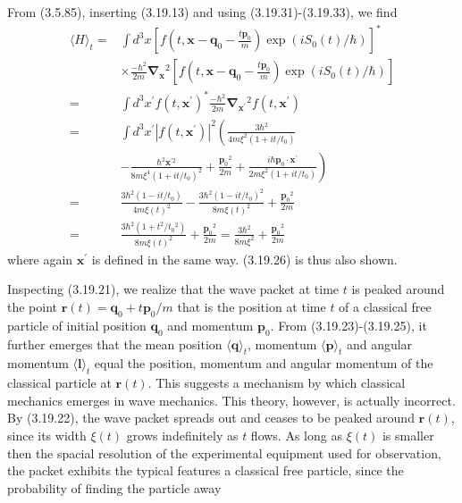 \documentclass{article}
\begin{document}
From (3.5.85), inserting (3.19.13) and using (3.19.31)-(3.19.33), we find
$$
\begin{align*}
\langle H\rangle_{t}= & \int d^{3} x\left[f\left(t, \boldsymbol{x}-\boldsymbol{q}_{0}-\frac{t \boldsymbol{p}_{0}}{m}\right) \exp \left(i S_{0}(t) / \hbar\right)\right]^{*}  \tag{3.19.40}\\
& \times \frac{-\hbar^{2}}{2 m} \boldsymbol{\nabla}_{\boldsymbol{x}}{ }^{2}\left[f\left(t, \boldsymbol{x}-\boldsymbol{q}_{0}-\frac{t \boldsymbol{p}_{0}}{m}\right) \exp \left(i S_{0}(t) / \hbar\right)\right] \\
= & \int d^{3} x^{\prime} f\left(t, \boldsymbol{x}^{\prime}\right)^{*} \frac{-\hbar^{2}}{2 m} \boldsymbol{\nabla}_{\boldsymbol{x}^{\prime}}{ }^{2} f\left(t, \boldsymbol{x}^{\prime}\right) \\
= & \int d^{3} x^{\prime}\left|f\left(t, \boldsymbol{x}^{\prime}\right)\right|^{2}\left(\frac{3 \hbar^{2}}{4 m \xi^{2}\left(1+i t / t_{0}\right)}\right. \\
& \left.-\frac{\hbar^{2} \boldsymbol{x}^{\prime 2}}{8 m \xi^{4}\left(1+i t / t_{0}\right)^{2}}+\frac{\boldsymbol{p}_{0}{ }^{2}}{2 m}+\frac{i \hbar \boldsymbol{p}_{0} \cdot \boldsymbol{x}^{\prime}}{2 m \xi^{2}\left(1+i t / t_{0}\right)}\right) \\
= & \frac{3 \hbar^{2}\left(1-i t / t_{0}\right)}{4 m \xi(t)^{2}}-\frac{3 \hbar^{2}\left(1-i t / t_{0}\right)^{2}}{8 m \xi(t)^{2}}+\frac{\boldsymbol{p}_{0}{ }^{2}}{2 m} \\
= & \frac{3 \hbar^{2}\left(1+t^{2} / t_{0}{ }^{2}\right)}{8 m \xi(t)^{2}}+\frac{\boldsymbol{p}_{0}{ }^{2}}{2 m}=\frac{3 \hbar^{2}}{8 m \xi^{2}}+\frac{\boldsymbol{p}_{0}{ }^{2}}{2 m}
\end{align*}
$$
where again $\boldsymbol{x}^{\prime}$ is defined in the same way. (3.19.26) is thus also shown.

Inspecting (3.19.21), we realize that the wave packet at time $t$ is peaked around the point $\boldsymbol{r}(t)=\boldsymbol{q}_{0}+t \boldsymbol{p}_{0} / m$ that is the position at time $t$ of a classical free particle of initial position $\boldsymbol{q}_{0}$ and momentum $\boldsymbol{p}_{0}$. From (3.19.23)-(3.19.25), it further emerges that the mean position $\langle\boldsymbol{q}\rangle_{t}$, momentum $\langle\boldsymbol{p}\rangle_{t}$ and angular momentum $\langle\boldsymbol{l}\rangle_{t}$ equal the position, momentum and angular momentum of the classical particle at $\boldsymbol{r}(t)$. This suggests a mechanism by which classical mechanics emerges in wave mechanics. This theory, however, is actually incorrect. By (3.19.22), the wave packet spreads out and ceases to be peaked around $\boldsymbol{r}(t)$, since its width $\xi(t)$ grows indefinitely as $t$ flows. As long as $\xi(t)$ is smaller then the spacial resolution of the experimental equipment used for observation, the packet exhibits the typical features a classical free particle, since the probability of finding the particle away
\end{document}
